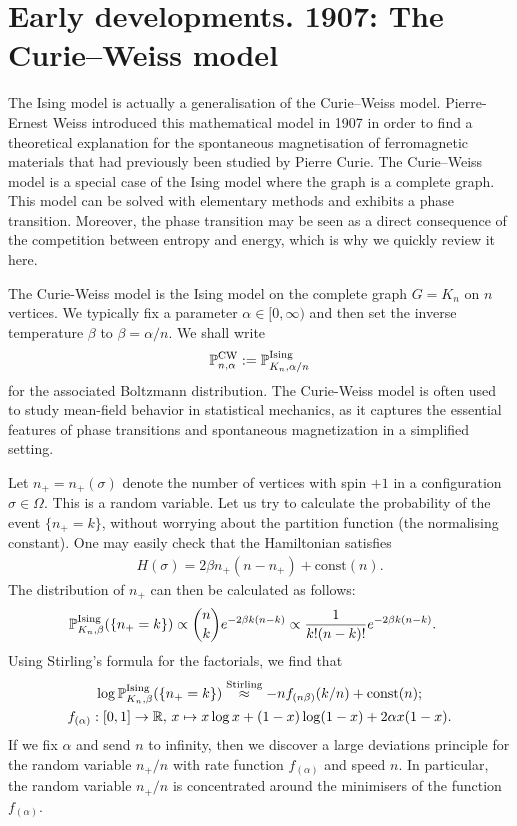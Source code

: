 \section{Early developments. 1907: The Curie--Weiss model}
\label{sec:definitions_examples}

The Ising model is actually a generalisation of the Curie--Weiss model.
Pierre-Ernest Weiss introduced this mathematical model in 1907 in order to find a theoretical
explanation for the spontaneous magnetisation of ferromagnetic materials
that had previously been studied by Pierre Curie.
The Curie--Weiss model is a special case of the Ising model
where the graph is a complete graph.
This model can be solved with elementary methods
and exhibits a phase transition.
Moreover, the phase transition may be seen as a direct consequence
of the competition between entropy and energy,
which is why we quickly review it here.

\begin{definition}
    The Curie-Weiss model is the Ising model on the complete graph \( G=K_n \) on \( n \) vertices.
    We typically fix a parameter $\alpha\in[0,\infty)$ and then set the inverse temperature $\beta$ to $\beta=\alpha/n$.
    We shall write
    \[\P^{\operatorname{CW}}_{n,\alpha}:=\P^{\operatorname{Ising}}_{K_n,\alpha/n}\]
    for the associated Boltzmann distribution.
    The Curie-Weiss model is often used to study mean-field behavior in statistical mechanics, as it captures the essential features of phase transitions and spontaneous magnetization in a simplified setting.
\end{definition}

Let $n_+=n_+(\sigma)$ denote the number of vertices with spin $+1$ in a configuration $\sigma\in\Omega$.
This is a random variable.
Let us try to calculate the probability of the event $\{n_+=k\}$,
without worrying about the partition function (the normalising constant).
One may easily check that
the Hamiltonian satisfies
\begin{align}
    H(\sigma)=2\beta n_+(n-n_+) + \text{const}(n).
\end{align}
The distribution of $n_+$ can then be calculated as follows:
\begin{align}
    \label{eq:CurieWeissDistribution}
    \P_{K_n,\beta}^{\operatorname{Ising}}(\{n_+ = k\}) &\propto \binom{n}{k} e^{-2\beta  k(n-k)}
    \propto \frac1{k! (n-k)!} e^{-2\beta k (n-k)}.
\end{align}
Using Stirling's formula for the factorials, we find that
\begin{gather}
    \log\P_{K_n,\beta}^{\operatorname{Ising}}(\{n_+ = k\}) 
    \stackrel{\text{Stirling}}{\approx}
    -n f_{(n\beta)}(k/n) + \text{const}(n);
    \\
    f_{(\alpha)}:[0,1]\to\R,\,
    x\mapsto x \log x + (1-x)\log (1-x) + 2 \alpha x (1-x).
\end{gather}
If we fix $\alpha$ and send $n$ to infinity, then 
we discover a large deviations principle for the random variable $n_+/n$
with rate function $f_{(\alpha)}$ and speed $n$.
In particular, the random variable $n_+/n$ is concentrated
around the minimisers of the function $f_{(\alpha)}$.

